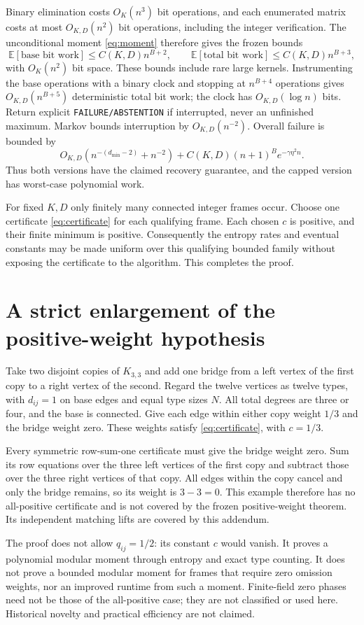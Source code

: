 \documentclass[11pt]{article}
\newcommand{\E}{\mathbb E}
\begin{document}
Binary elimination costs $O_K(n^3)$ bit operations, and each enumerated
matrix costs at most $O_{K,D}(n^2)$ bit operations, including the
integer verification. The unconditional moment \eqref{eq:moment}
therefore gives the frozen bounds
\[
 \E[\text{base bit work}]\le C(K,D)n^{B+2},\qquad
 \E[\text{total bit work}]\le C(K,D)n^{B+3},
\]
with $O_K(n^2)$ bit space. These bounds include rare large kernels.
Instrumenting the base operations with a binary clock and stopping at
$n^{B+4}$ operations gives $O_{K,D}(n^{B+5})$ deterministic total
bit work; the clock has $O_{K,D}(\log n)$ bits. Return explicit
\texttt{FAILURE/ABSTENTION} if interrupted, never an unfinished maximum.
Markov bounds interruption by $O_{K,D}(n^{-2})$. Overall failure is
bounded by
\[
 O_{K,D}(n^{-(d_{\min}-2)}+n^{-2})
       +C(K,D)(n+1)^B e^{-\gamma\eta^2 n}.
\]
Thus both versions have the claimed recovery guarantee, and the capped
version has worst-case polynomial work.

For fixed $K,D$ only finitely many connected integer frames occur.
Choose one certificate \eqref{eq:certificate} for each qualifying
frame. Each chosen $c$ is positive, and their finite minimum is positive.
Consequently the entropy rates and eventual constants may be made
uniform over this qualifying bounded family without exposing the
certificate to the algorithm. This completes the proof.

\section{A strict enlargement of the positive-weight hypothesis}
Take two disjoint copies of $K_{3,3}$ and add one bridge from a left
vertex of the first copy to a right vertex of the second. Regard the
twelve vertices as twelve types, with $d_{ij}=1$ on base edges and
equal type sizes $N$. All total degrees are three or four, and the
base is connected. Give each edge within either copy weight $1/3$
and the bridge weight zero. These weights satisfy
\eqref{eq:certificate}, with $c=1/3$.

Every symmetric row-sum-one certificate must give the bridge weight
zero. Sum its row equations over the three left vertices of the first
copy and subtract those over the three right vertices of that copy.
All edges within the copy cancel and only the bridge remains, so its
weight is $3-3=0$. This example therefore has no all-positive
certificate and is not covered by the frozen positive-weight theorem.
Its independent matching lifts are covered by this addendum.

The proof does not allow $q_{ij}=1/2$: its constant $c$ would vanish.
It proves a polynomial modular moment through entropy and exact type
counting. It does not prove a bounded modular moment for frames that
require zero omission weights, nor an improved runtime from such a
moment. Finite-field zero phases need not be those of the all-positive
case; they are not classified or used here. Historical novelty and
practical efficiency are not claimed.
\end{document}
